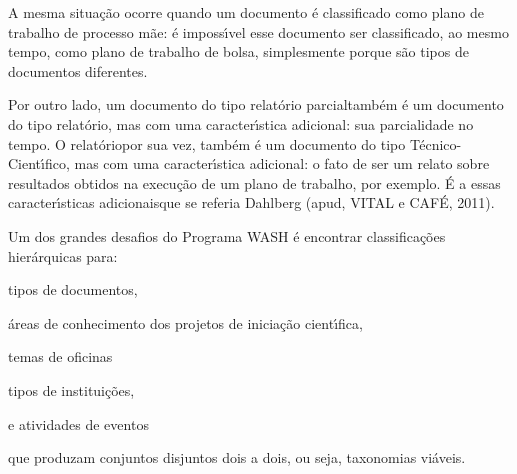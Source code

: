 \documentclass[
12pt,		%
openright,	%
twoside,  %
a4paper,			%
chapter=TITLE,		%
english,			%
french,				%
spanish,			%
brazil				%
]{USPSC-classe/USPSC}
\begin{document}
A mesma situa\c{c}\~ao ocorre quando um documento \'e classificado como \textquotedbl plano de trabalho de processo m\~ae\textquotedbl : \'e imposs\'{\i}vel esse documento ser classificado, ao mesmo tempo, como \textquotedbl plano de trabalho de bolsa\textquotedbl , simplesmente porque s\~ao tipos de documentos diferentes.









Por outro lado, um documento do tipo \textquotedbl relat\'orio parcial\textquotedbl  tamb\'em \'e um documento do tipo \textquotedbl relat\'orio\textquotedbl , mas com uma caracter\'{\i}stica adicional: sua parcialidade no tempo. O \textquotedbl relat\'orio\textquotedbl  por sua vez, tamb\'em \'e um documento do tipo \textquotedbl T\'ecnico-Cient\'{\i}fico\textquotedbl , mas com uma caracter\'{\i}stica adicional: o fato de ser um relato sobre resultados obtidos na execu\c{c}\~ao de um plano de trabalho, por exemplo. \'E a essas \textquotedbl caracter\'{\i}sticas adicionais\textquotedbl  que se referia Dahlberg  (apud, VITAL e CAF\'E, 2011).









Um dos grandes desafios do Programa WASH \'e encontrar classifica\c{c}\~oes hier\'arquicas para:










\begin{alineas}
\item \textquotedbl tipos de documentos\textquotedbl ,
\item \textquotedbl \'areas de conhecimento dos projetos de inicia\c{c}\~ao cient\'{\i}fica\textquotedbl ,
\item \textquotedbl temas de oficinas\textquotedbl 
\item \textquotedbl tipos de institui\c{c}\~oes\textquotedbl ,
\item e \textquotedbl atividades de eventos\textquotedbl 
\end{alineas}

que produzam conjuntos disjuntos dois a dois, ou seja, taxonomias vi\'aveis.
\end{document}
